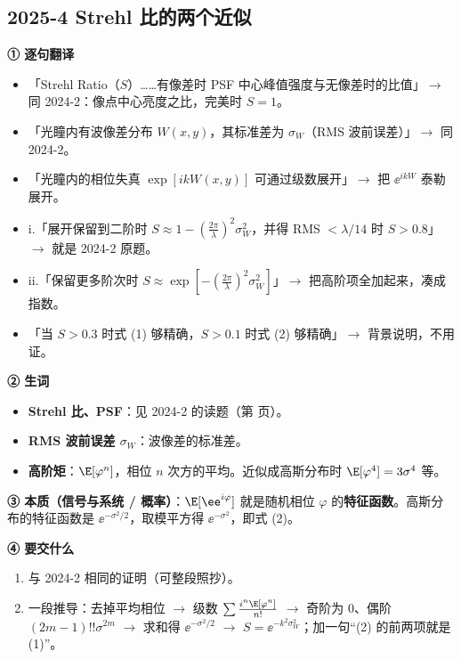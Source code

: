 \subsection{2025-4 Strehl 比的两个近似}\label{ex:2025-4}
\label{rd:2025-4}
\begin{idea}[读题：这道题在说什么]
\textbf{① 逐句翻译}
\begin{itemize}
\item 「Strehl Ratio（$S$）……有像差时 PSF 中心峰值强度与无像差时的比值」$\to$ 同 2024-2：像点中心亮度之比，完美时 $S=1$。
\item 「光瞳内有波像差分布 $W(x,y)$，其标准差为 $\sigma_W$（RMS 波前误差）」$\to$ 同 2024-2。
\item 「光瞳内的相位失真 $\exp[ikW(x,y)]$ 可通过级数展开」$\to$ 把 $\ee^{ikW}$ 泰勒展开。
\item i.「展开保留到二阶时 $S\approx1-(\frac{2\pi}{\lambda})^2\sigma_W^2$，并得 RMS $<\lambda/14$ 时 $S>0.8$」$\to$ 就是 2024-2 原题。
\item ii.「保留更多阶次时 $S\approx\exp[-(\frac{2\pi}{\lambda})^2\sigma_W^2]$」$\to$ 把高阶项全加起来，凑成指数。
\item 「当 $S>0.3$ 时式 (1) 够精确，$S>0.1$ 时式 (2) 够精确」$\to$ 背景说明，不用证。
\end{itemize}
\textbf{② 生词}
\begin{itemize}
\item \textbf{Strehl 比、PSF}：见 2024-2 的读题（第 \pageref{rd:2024-2} 页）。
\item \textbf{RMS 波前误差 $\sigma_W$}：波像差的标准差。
\item \textbf{高阶矩}：$\E[\varphi^n]$，相位 $n$ 次方的平均。近似成高斯分布时 $\E[\varphi^4]=3\sigma^4$ 等。
\end{itemize}
\textbf{③ 本质（信号与系统 / 概率）}：$\E[\ee^{i\varphi}]$ 就是随机相位 $\varphi$ 的\textbf{特征函数}。高斯分布的特征函数是 $\ee^{-\sigma^2/2}$，取模平方得 $\ee^{-\sigma^2}$，即式 (2)。

\textbf{④ 要交什么}
\begin{enumerate}[label=\roman*.]
\item 与 2024-2 相同的证明（可整段照抄）。
\item 一段推导：去掉平均相位 $\to$ 级数 $\sum\frac{i^n\E[\varphi^n]}{n!}$ $\to$ 奇阶为 0、偶阶 $(2m-1)!!\sigma^{2m}$ $\to$ 求和得 $\ee^{-\sigma^2/2}$ $\to$ $S=\ee^{-k^2\sigma_W^2}$；加一句“(2) 的前两项就是 (1)”。
\end{enumerate}
\end{idea}

